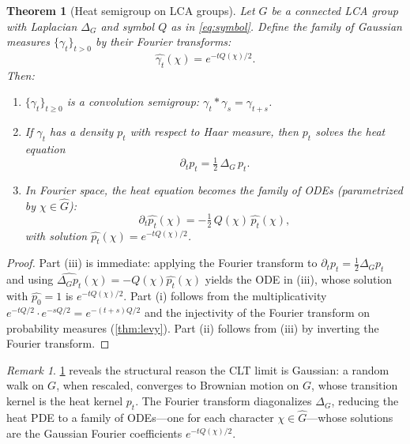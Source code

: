 \documentclass[12pt]{amsart}
\newtheorem{theorem}{Theorem}[section]
\theoremstyle{definition}
\theoremstyle{remark}
\newtheorem*{remark}{Remark}
\begin{document}
\begin{theorem}[Heat semigroup on LCA groups]\label{thm:heat-semigroup}
Let $G$ be a connected LCA group with Laplacian $\Delta_G$ and symbol $Q$ as in \eqref{eq:symbol}. Define the family of Gaussian measures $\{\gamma_t\}_{t > 0}$ by their Fourier transforms:
\[
\widehat{\gamma_t}(\chi) = e^{-tQ(\chi)/2}.
\]
Then:
\begin{enumerate}[label=(\roman*)]
\item $\{\gamma_t\}_{t \geq 0}$ is a convolution semigroup: $\gamma_t * \gamma_s = \gamma_{t+s}$.
\item If $\gamma_t$ has a density $p_t$ with respect to Haar measure, then $p_t$ solves the heat equation
\[
\partial_t p_t = \tfrac{1}{2}\,\Delta_G\, p_t.
\]
\item In Fourier space, the heat equation becomes the family of ODEs (parametrized by $\chi \in \widehat{G}$):
\[
\partial_t \widehat{p_t}(\chi) = -\tfrac{1}{2}\, Q(\chi)\, \widehat{p_t}(\chi),
\]
with solution $\widehat{p_t}(\chi) = e^{-tQ(\chi)/2}$.
\end{enumerate}
\end{theorem}

\begin{proof}
Part (iii) is immediate: applying the Fourier transform to $\partial_t p_t = \frac{1}{2}\Delta_G p_t$ and using $\widehat{\Delta_G p_t}(\chi) = -Q(\chi)\widehat{p_t}(\chi)$ yields the ODE in (iii), whose solution with $\widehat{p_0} = 1$ is $e^{-tQ(\chi)/2}$. Part (i) follows from the multiplicativity $e^{-tQ/2} \cdot e^{-sQ/2} = e^{-(t+s)Q/2}$ and the injectivity of the Fourier transform on probability measures (\cref{thm:levy}). Part (ii) follows from (iii) by inverting the Fourier transform.
\end{proof}

\begin{remark}\label{rmk:heat-clt}
\cref{thm:heat-semigroup} reveals the structural reason the CLT limit is Gaussian: a random walk on $G$, when rescaled, converges to Brownian motion on $G$, whose transition kernel is the heat kernel $p_t$. The Fourier transform diagonalizes $\Delta_G$, reducing the heat PDE to a family of ODEs---one for each character $\chi \in \widehat{G}$---whose solutions are the Gaussian Fourier coefficients $e^{-tQ(\chi)/2}$.
\end{remark}
\end{document}
